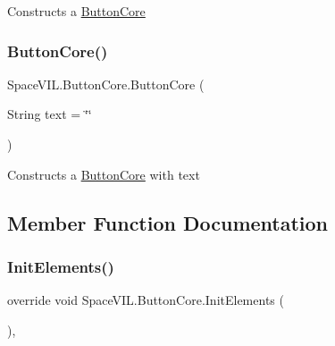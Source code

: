 Constructs a \mbox{\hyperlink{class_space_v_i_l_1_1_button_core}{Button\+Core}} 

\mbox{\label{class_space_v_i_l_1_1_button_core_af14e7efaa232a4ce2685fad35b6d691a}} 
\subsubsection{\texorpdfstring{Button\+Core()}{ButtonCore()}\hspace{0.1cm}{\footnotesize\ttfamily [2/2]}}
{\footnotesize\ttfamily Space\+V\+I\+L.\+Button\+Core.\+Button\+Core (\begin{DoxyParamCaption}\item[{String}]{text = {\ttfamily \char`\"{}\char`\"{}} }\end{DoxyParamCaption})\hspace{0.3cm}{\ttfamily [inline]}}



Constructs a \mbox{\hyperlink{class_space_v_i_l_1_1_button_core}{Button\+Core}} with text 



\subsection{Member Function Documentation}
\mbox{\label{class_space_v_i_l_1_1_button_core_a4321848c2398d6e08da3bfea649e3e31}} 
\subsubsection{\texorpdfstring{Init\+Elements()}{InitElements()}}
{\footnotesize\ttfamily override void Space\+V\+I\+L.\+Button\+Core.\+Init\+Elements (\begin{DoxyParamCaption}{ }\end{DoxyParamCaption})\hspace{0.3cm}{\ttfamily [inline]}, {\ttfamily [virtual]}}



